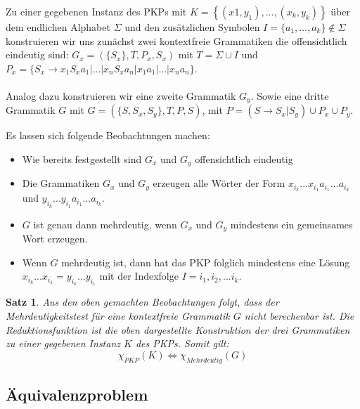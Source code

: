 \documentclass[]{scrartcl}
\newtheorem{satz}[definition]{Satz}
\begin{document}
		Zu einer gegebenen Instanz des PKPs mit $K = \left\lbrace (x1, y_1), ..., (x_k, y_k) \right\rbrace$ über dem endlichen Alphabet $\Sigma$ und den zusätzlichen Symbolen $I = \{a_1, ..., a_k\} \notin \Sigma$ konstruieren wir uns zunächst zwei kontextfreie Grammatiken die offensichtlich eindeutig sind:
		\newline\newline
		$G_x = (\{S_x\}, T, P_x, S_x)$ mit $T = \Sigma \cup I$ und $P_x = \{S_x \rightarrow x_1 S_x a_1 | ... | x_n S_x a_n | x_1 a_1 | ... | x_n a_n\}$.\\ \\
		Analog dazu konstruieren wir eine zweite Grammatik $G_y$. Sowie eine dritte Grammatik $G$ mit \newline\newline
		$G = (\{S, S_x, S_y\}, T, P, S)$, mit $P = (S \rightarrow S_x | S_y) \cup P_x \cup P_y$.
		
		Es lassen sich folgende Beobachtungen machen:
		\begin{itemize}
		\item Wie bereits festgestellt sind $G_x$ und $G_y$ offensichtlich eindeutig
		\item Die Grammatiken $G_x$ und $G_y$ erzeugen alle Wörter der Form $x_{i_k}...x_{i_1}a_{i_1}...a_{i_k}$ und $y_{i_k}...y_{i_1}a_{i_1}...a_{i_k}$.
		\item $G$ ist genau dann mehrdeutig, wenn $G_x$ und $G_y$ mindestens ein gemeinsames Wort erzeugen.
		\item Wenn $G$ mehrdeutig ist, dann hat das PKP folglich mindestens eine Lösung $x_{i_k}...x_{i_1} = y_{i_k}...y_{i_1}$ mit der Indexfolge $I = {i_1, i_2, ... i_k}$.
		\end{itemize}
		
		\begin{satz}
		Aus den oben gemachten Beobachtungen folgt, dass der Mehrdeutigkeitstest für eine kontextfreie Grammatik $G$ nicht berechenbar ist. Die Reduktionsfunktion ist die oben dargestellte Konstruktion der drei Grammatiken zu einer gegebenen Instanz $K$ des PKPs. Somit gilt:
		\[\chi_{PKP} (K) \Leftrightarrow \chi_{Mehrdeutig}(G)\]
		\end{satz}
		

	\subsection{Äquivalenzproblem}
\end{document}
